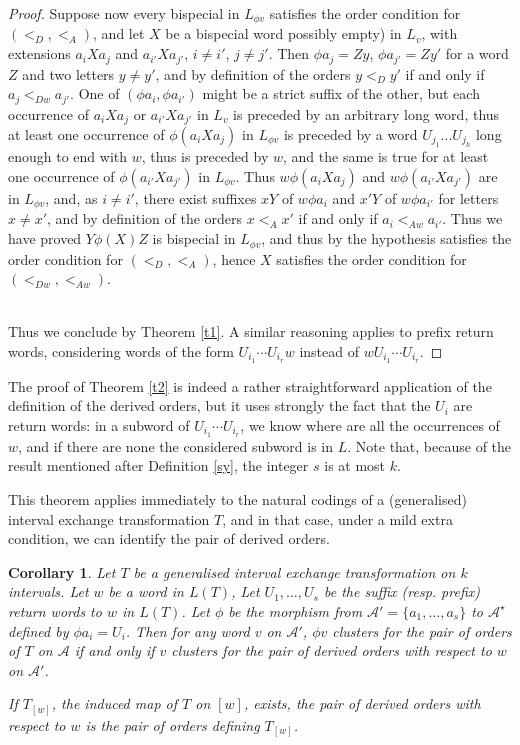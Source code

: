 \documentclass[12pt,a4paper]{amsart}
\newtheorem{corollary}[theorem]{Corollary}
\begin{document}
\begin{proof}
Suppose now every bispecial in $L_{\phi v}$ satisfies the order condition for $(<_D,<_A)$, and let $X$ be a bispecial word possibly empty) in $L_v$, with extensions $a_iXa_j$ and $a_{i'}Xa_{j'}$, $i\neq i'$, $j\neq j'$. Then $\phi a_j=Zy$, $\phi a_{j'}=Zy'$ for a word $Z$ and two letters $y\neq y'$, and by definition of the orders $y<_D y'$ if and only if $a_j<_{Dw} a_{j'}$. One of $(\phi a_i, \phi a_{i'})$ might be a strict suffix of the other, but each occurrence of $a_iXa_j$ or $a_{i'}Xa_{j'}$ in $L_v$ is preceded by an arbitrary long word, thus at least one occurrence of $\phi (a_iXa_j)$ in $L_{\phi v}$ is preceded by a word $U_{j_1}...U_{j_h}$ long enough
 to end with $w$, thus is preceded by $w$, and the same is true for at least one occurrence of $\phi (a_{i'}Xa_{j'})$ in $L_{\phi v}$. Thus $w\phi (a_iXa_j)$ and $w\phi (a_{i'}Xa_{j'})$ are in $L_{\phi v}$, and, as $i\neq i'$, there exist suffixes $xY$ of $w\phi a_i$ and $x'Y$ of $w\phi a_{i'}$ for letters $x\neq x'$, and by definition of the orders $x <_A x'$ if and only if $a_i<_{Aw} a_{i'}$. Thus we have proved $Y\phi (X)Z$ is bispecial in $L_{\phi v}$, and  thus by the hypothesis satisfies the order condition for $(<_{D},<_{A})$, hence $X$ satisfies the order condition for $(<_{Dw},<_{Aw})$.\\\

Thus we conclude by Theorem \ref{t1}.  A similar reasoning applies to prefix return words, considering words  of the form  $U_{i_1}\cdots U_{i_r}w$  instead of  $wU_{i_1}\cdots U_{i_r}$. \end{proof}
The proof of Theorem \ref{t2} is indeed a rather straightforward application of the definition 
of the derived orders, but it uses strongly the fact that the $U_i$ are return words: in a subword of $U_{i_1}\cdots U_{i_r}$, we know where are all the occurrences of $w$, and if there are none  the considered subword is in  $L$. Note that, because of the result mentioned  after Definition \ref{sy}, the integer $s$ is at most $k$.

This theorem applies immediately to the natural codings of   a (generalised)  interval exchange transformation $T$, and in that case, under a mild extra condition, we can identify the pair of derived orders. 

\begin{corollary}\label{clie} Let $T$ be  a generalised interval exchange transformation on  $k$ intervals. Let $w$ be a word in $L(T)$, Let $U_1, \ldots ,U_s$ be the
suffix (resp. prefix) return words to $w$ in $L(T)$.  Let $\phi$ be the morphism from $\mathcal A'=\{a_1, \ldots ,a_s\}$ to $\mathcal A^{\star}$ defined by $\phi a_i=U_i$. 
Then  for any word $v$ on $\mathcal A'$,  $\phi v$ clusters for the pair of orders of $T$ on $\mathcal A$  if and only if $v$ clusters for the pair of derived orders with respect to $w$ on $\mathcal A'$. 

If $T_{[w]}$, the induced map of $T$ on $[w]$, exists, the pair of derived orders with respect to $w$ is  the pair of orders defining $T_{[w]}$.\end{corollary}
\end{document}
